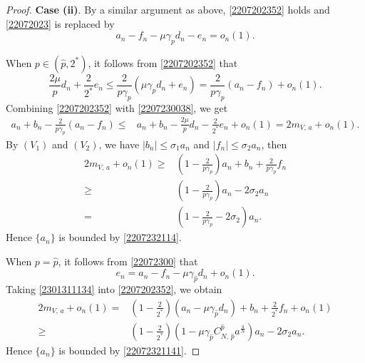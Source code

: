 \documentclass[10pt]{article}
\numberwithin{equation}{section}
\newcommand{\ud}{\mathrm{d}}
\numberwithin{equation}{section}
\begin{document}
\begin{proof}
\bigskip
\noindent
{\bf Case (ii)}. By a similar argument as above, \eqref{2207202352} holds and \eqref{22072023} is replaced by
\begin{equation}\label{22072300}
a_n-f_n-\mu\gamma_p d_n -e_n=o_n(1).
\end{equation}\par
When $p\in (\hat{p}, 2^*)$, it follows from \eqref{2207202352} that
\begin{equation}\label{2207230038}
\frac{2\mu}{p}d_n+\frac{2}{2^*}e_n\le \frac{2}{p\gamma_p}\left(\mu\gamma_p d_n+e_n\right)=\frac{2}{p\gamma_p}\left(a_n-f_n\right)+o_n(1).
\end{equation}
Combining \eqref{2207202352} with \eqref{2207230038}, we get
\[
\begin{aligned}
a_n+b_n-\frac{2}{p\gamma_p}\left(a_n-f_n \right)
\le &a_n+b_n-\frac{2\mu}{p}d_n-\frac{2}{2^*}e_n+o_n(1) =2{m}_{V,\, a}+o_n(1).
\end{aligned}
\]
By $(V_1)$ and $(V_2)$, we have $|b_n|\le \sigma_1 a_n$ and $|f_n|\le \sigma_2 a_n$, then
\[
\begin{aligned}
2{m}_{V,\, a}+o_n(1)\ge& \left(1-\frac{2}{p\gamma_p}\right)a_n+b_n+\frac{2}{p\gamma_p}f_n
\\
\ge &\left(1-\frac{2}{p\gamma_p}\right)a_n- 2\sigma_2 a_n\\
=&\left(1-\frac{2}{p\gamma_p}-2\sigma_2\right)a_n.
\end{aligned}
\]
Hence $\{a_n\}$ is bounded by \eqref{2207232114}. \par
When $p=\hat{p}$, it follows from \eqref{22072300} that
\begin{equation}\label{2301311134}
e_n=a_n-f_n-\mu\gamma_{\hat{p}} d_n+o_n(1).
\end{equation}
Taking \eqref{2301311134} into \eqref{2207202352}, we obtain
\[
\begin{aligned}
2{m}_{V,\, a}+o_n(1)=&\left(1-\frac2{2^*}\right)\left(a_n-\mu\gamma_{\hat{p}} d_n\right)+b_n+\frac{2}{2^*}f_n +o_n(1)\\
\ge & \left(1-\frac2{2^*}\right)\left(1-\mu \gamma_{\hat{p}}C^{\hat{p}}_{N,\, {\hat{p}}}a^{\frac4N}\right)a_n-2\sigma_2a_n.
\end{aligned}
\]
Hence $\{a_n\}$ is bounded by \eqref{22072321141}.
\end{proof}
\end{document}
